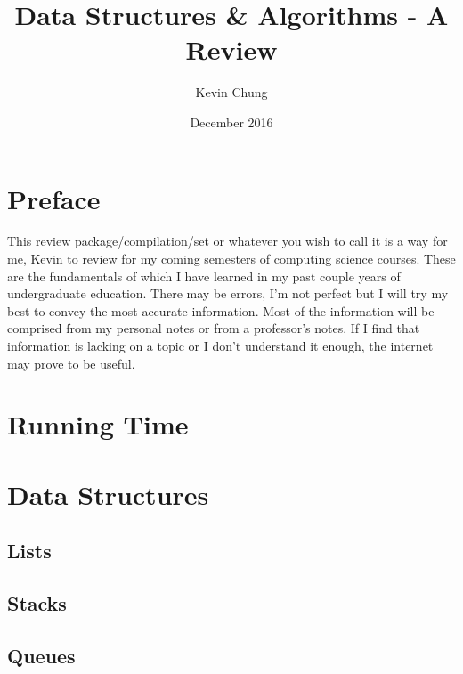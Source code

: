 \documentclass{article}
\title{Data Structures \& Algorithms - A Review}
\author{Kevin Chung}
\date{December 2016}
\begin{document}
\begin{titlepage}
\maketitle
\thispagestyle{empty}
\end{titlepage}

\newpage
\tableofcontents
\thispagestyle{empty}
\newpage

\clearpage
\setcounter{page}{1}

\section{Preface}
This review package/compilation/set or whatever you wish to call it is a way for me, Kevin to review for my coming semesters of computing science courses. These are the fundamentals of which I have learned in my past couple years of undergraduate education. There may be errors, I'm not perfect but I will try my best to convey the most accurate information. Most of the information will be comprised from my personal notes or from a professor's notes. If I find that information is lacking on a topic or I don't understand it enough, the internet may prove to be useful. 

\section{Running Time}

\section{Data Structures}

\subsection{Lists}
\subsection{Stacks}
\subsection{Queues}
\
\end{document}
